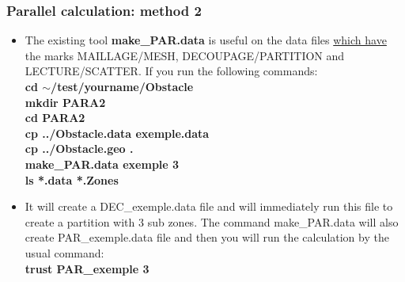 \documentclass[10pt]{beamer}
\begin{document}
\begin{frame}
\frametitle{Parallel calculation: method 2}
\begin{block}{}

\begin{itemize}
\item The existing tool \textbf{make\_PAR.data} is useful on the data files \underline{which have} the marks MAILLAGE/MESH, DECOUPAGE/PARTITION and LECTURE/SCATTER. If you run the following commands: \\
\textbf{cd $\sim$/test/yourname/Obstacle} \\
\textbf{mkdir PARA2} \\
\textbf{cd PARA2} \\
\textbf{cp ../Obstacle.data exemple.data}\\
\textbf{cp ../Obstacle.geo .}\\
\textbf{make\_PAR.data exemple 3}\\
\textbf{ls *.data *.Zones}\\

\item It will create a DEC\_exemple.data file and will immediately run this file to create a partition with 3 sub zones. The command make\_PAR.data will also create PAR\_exemple.data file and then you will run the calculation by the usual command:\\
\textbf{trust PAR\_exemple 3}
\end{itemize}

\end{block}
\end{frame}
\end{document}
